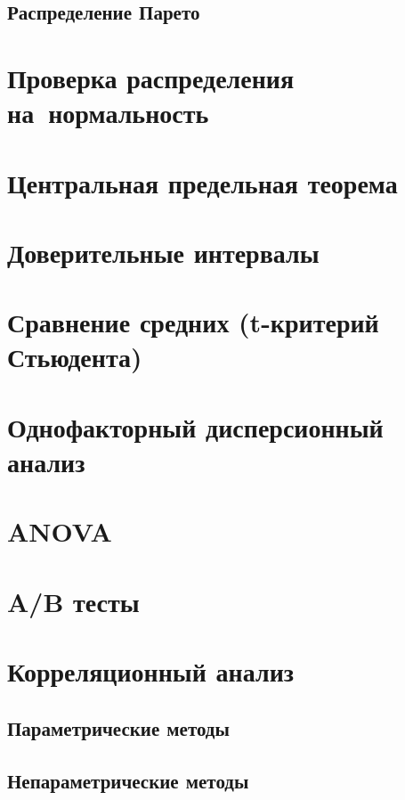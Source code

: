\documentclass[]{scrartcl}
\begin{document}
\subsection{Распределение Парето}

\section{Проверка распределения на~нормальность}

\section{Центральная предельная теорема}

\section{Доверительные интервалы}

\section{Сравнение средних (t-критерий Стьюдента)}

\section{Однофакторный дисперсионный анализ}

\section{ANOVA}

\section{A/B тесты}

\section{Корреляционный анализ}

\subsection{Параметрические методы}

\subsection{Непараметрические методы}
\end{document}
